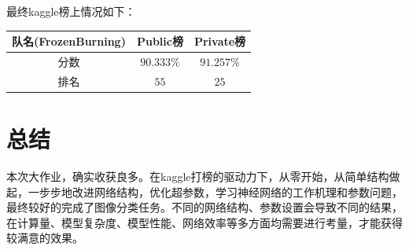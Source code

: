 \documentclass[UTF8]{ctexart}
\begin{document}
最终kaggle榜上情况如下：
\begin{table}[H]
    \centering
    \begin{tabular}{ccc}
        \hline
        队名(\textbf{FrozenBurning})&Public榜&\textbf{Private榜}\\
        \hline
        分数 & $90.333\%$ &$91.257\%$\\
        排名 &$55$ &$25$\\
        \hline
    \end{tabular}
\end{table}

\section{总结}

本次大作业，确实收获良多。在kaggle打榜的驱动力下，从零开始，从简单结构做起，一步步地改进网络结构，优化超参数，学习神经网络的工作机理和参数问题，最终较好的完成了图像分类任务。不同的网络结构、参数设置会导致不同的结果，在计算量、模型复杂度、模型性能、网络效率等多方面均需要进行考量，才能获得较满意的效果。
\end{document}
